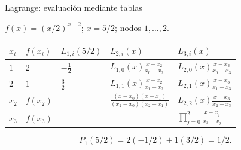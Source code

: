 \documentclass[main.tex]{subfiles}
\begin{document}
\begin{frame}[t]{Lagrange: evaluación mediante tablas}
\par\noindent\begin{minipage}[t][12mm][t]{\textwidth}\small\strut $f(x)=(x/2)^{x-2}$; $x=5/2$; nodos $1,\ldots,2$.\end{minipage}\par\nointerlineskip
\begin{minipage}[t]{\textwidth}\begingroup\scriptsize\setlength{\tabcolsep}{3pt}\begin{center}\begin{tabular}{|C{.065\textwidth}|C{.095\textwidth}|C{.19\textwidth}|C{.25\textwidth}|C{.25\textwidth}|}\hline
\rule[-2mm]{0pt}{6mm}$x_i$&$f(x_i)$&$L_{1,i}(5/2)$&$L_{2,i}(x)$&$L_{3,i}(x)$\\\hline
\rule[-2.5mm]{0pt}{9mm}$1$&$2$&$-\frac12$&$L_{1,0}(x)\frac{x-x_2}{x_0-x_2}$&$L_{2,0}(x)\frac{x-x_3}{x_0-x_3}$\\\hline
\rule[-2.5mm]{0pt}{9mm}$2$&$1$&$\frac32$&$L_{1,1}(x)\frac{x-x_2}{x_1-x_2}$&$L_{2,1}(x)\frac{x-x_3}{x_1-x_3}$\\\hline
\rule[-2.5mm]{0pt}{9mm}$x_2$&$f(x_2)$&&$\frac{(x-x_0)(x-x_1)}{(x_2-x_0)(x_2-x_1)}$&$L_{2,2}(x)\frac{x-x_3}{x_2-x_3}$\\\hline
\rule[-2.5mm]{0pt}{9mm}$x_3$&$f(x_3)$&&&$\prod_{j=0}^2\frac{x-x_j}{x_3-x_j}$\\\hline
\end{tabular}\end{center}\endgroup\par
\end{minipage}\par\[P_1(5/2)=2(-1/2)+1(3/2)=1/2.\]
\end{frame}
\end{document}
